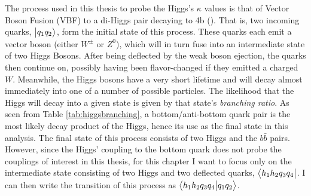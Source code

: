     The process used in this thesis to probe the Higgs's $\kappa$ values is that of
        Vector Boson Fusion (VBF) to a di-Higgs pair decaying to 4b (\vbfhhproc).
    That is, two incoming quarks, $\big| q_1 q_2 \big>$, form the initial state of this process.
    These quarks each emit a vector boson (either $W^{\pm}$ or $Z^0$), 
        which will in turn fuse into an intermediate state of two Higgs Bosons.
    After being deflected by the weak boson ejection, the quarks then continue on,
        possibly having been flavor-changed if they emitted a charged $W$.
    Meanwhile, the Higgs bosons have a very short lifetime and will decay almost immediately into one of a number of possible particles.
    The likelihood that the Higgs will decay into a given state is given by that state's \textit{branching ratio}.
    As seen from Table \ref{tab:higgsbranching}, a bottom/anti-bottom quark pair is the most likely decay product of the Higgs,
        hence its use as the final state in this analysis.
    The final state of this process consists of two Higgs and the $b \bar{b}$ pairs.
    However, since the Higgs' coupling to the bottom quark does not probe the couplings of interest in this thesis,
        for this chapter I want to focus only on the intermediate state
        consisting of two Higgs and two deflected quarks,
            $\big< h_1 h_2 q_3 q_4 \big|$.
    I can then write the transition of this process as $\big<  h_1 h_2 q_3 q_4 \big| q_1 q_2 \big>$.

    


